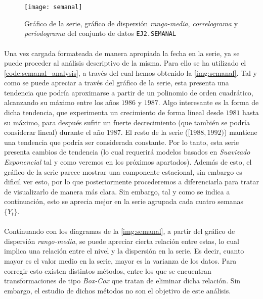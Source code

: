 \documentclass[a4paper, spanish]{article}
\begin{document}
      \begin{figure}[htb!]
        \centering
        \texttt{[image: semanal]}
        \caption{Gráfico de la serie, gráfico de dispersión \emph{rango-media}, \emph{correlograma} y \emph{periodograma} del conjunto de datos \texttt{EJ2.SEMANAL}}
        \label{img:semanal}
      \end{figure}

      \paragraph{}
      Una vez cargada formateada de manera apropiada la fecha en la serie, ya se puede proceder al análisis descriptivo de la misma. Para ello se ha utilizado el \autoref{code:semanal_analysis}, a través del cual hemos obtenido la \autoref{img:semanal}. Tal y como se puede apreciar a través del gráfico de la serie, esta presenta una tendencia que podría aproximarse a partir de un polinomio de orden cuadrático, alcanzando su máximo entre los años $1986$ y $1987$. Algo interesante es la forma de dicha tendencia, que experimenta un crecimiento de forma lineal desde $1981$ hasta su máximo, para después sufrir un fuerte decrecimiento (que también se podría considerar lineal) durante el año $1987$. El resto de la serie ($[1988,1992)$) mantiene una tendencia que podría ser considerada constante. Por lo tanto, esta serie presenta cambios de tendencia (lo cual requerirá modelos basados en \emph{Suavizado Exponencial} tal y como veremos en los próximos apartados). Además de esto, el gráfico de la serie parece mostrar una componente estacional, sin embargo es dificil ver esto, por lo que posteriormente procederemos a diferenciarla para tratar de visualizarlo de manera más clara. Sin embargo, tal y como se indica a continuación, esto se aprecia mejor en la serie agrupada cada cuatro semanas $\{Y_t\}$.

      \paragraph{}
      Continuando con los diagramas de la \autoref{img:semanal}, a partir del gráfico de dispersión \emph{rango-media}, se puede apreciar cierta relación entre estas, lo cual implica una relación entre el nivel y la dispersión en la serie. Es decir, cuanto mayor es el valor medio en la serie, mayor es la varianza de los datos. Para corregir esto existen distintos métodos, entre los que se encuentran transformaciones de tipo \emph{Box-Cox} que tratan de eliminar dicha relación. Sin embargo, el estudio de dichos métodos no son el objetivo de este análisis.
\end{document}
